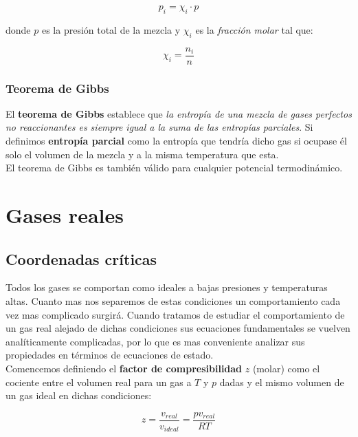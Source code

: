 \documentclass[12pt]{book}
\begin{document}
\begin{equation}
p_i = \chi_i \cdot p
\end{equation}

donde $p$ es la presión total de la mezcla y $\chi_i$ es la \textit{fracción molar} tal que:

\begin{equation}
\chi_i = \frac{n_i}{n}
\end{equation}

\subsection{Teorema de Gibbs}

El \textbf{teorema de Gibbs} establece que \textit{la entropía de una mezcla de gases perfectos no reaccionantes es siempre igual a la suma de las entropías parciales}. Si definimos \textbf{entropía parcial} como la entropía que tendría dicho gas si ocupase él solo el volumen de la mezcla y a la misma temperatura que esta. \\

El teorema de Gibbs es también válido para cualquier potencial termodinámico. 

\chapter{Gases reales}

\section{Coordenadas críticas}

Todos los gases se comportan como ideales a bajas presiones y temperaturas altas. Cuanto mas nos separemos de estas condiciones un comportamiento cada vez mas complicado surgirá. Cuando tratamos de estudiar el comportamiento de un gas real alejado de dichas condiciones sus ecuaciones fundamentales se vuelven analíticamente complicadas, por lo que es mas conveniente analizar sus propiedades en términos de ecuaciones de estado.\\

Comencemos definiendo el \textbf{factor de compresibilidad} $z$ (molar) como el cociente entre el volumen real para un gas a $T$ y $p$ dadas y el mismo volumen de un gas ideal en dichas condiciones:

\begin{equation}
z = \dfrac{v_{real}}{v_{ideal}} = \dfrac{p v_{real}}{RT}
\end{equation}
\end{document}
